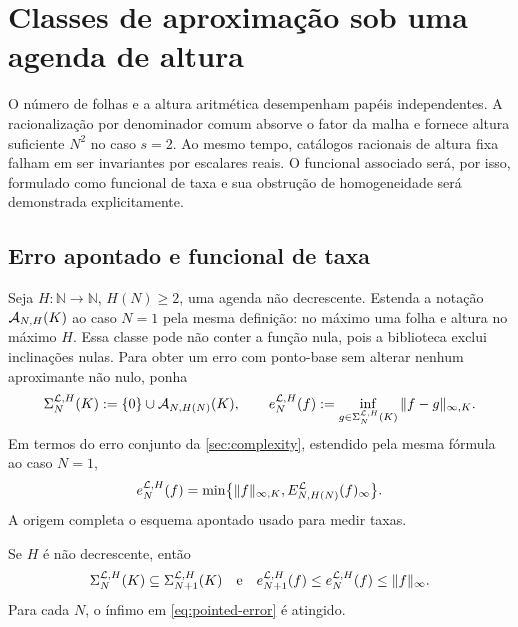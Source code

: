 \section{Classes de aproximação sob uma agenda de altura}
\label{sec:approximation-classes}

O número de folhas e a altura aritmética desempenham papéis independentes. A
racionalização por denominador comum absorve o fator da malha e fornece
altura suficiente $N^2$ no caso $s=2$. Ao mesmo tempo, catálogos racionais de
altura fixa falham em ser invariantes por escalares reais. O funcional
associado será, por isso, formulado como funcional de taxa e sua obstrução de
homogeneidade será demonstrada explicitamente.

\subsection{Erro apontado e funcional de taxa}

Seja $H:\mathbb N\to\mathbb N$, $H(N)\ge2$, uma agenda não decrescente.
Estenda a notação $\mathcal{A}_{N,H}(K)$ ao caso $N=1$ pela mesma
definição: no máximo uma folha e altura no máximo $H$. Essa classe pode não
conter a função nula, pois a
biblioteca exclui inclinações nulas. Para obter um erro com ponto-base sem
alterar nenhum aproximante não nulo, ponha
\begin{equation}
 \Sigma_N^{\mathcal{L},H}(K)
 :=\{0\}\cup\mathcal{A}_{N,H(N)}(K),
 \qquad
 e_N^{\mathcal{L},H}(f)
 :=\inf_{g\in\Sigma_N^{\mathcal{L},H}(K)}\|f-g\|_{\infty,K}.
 \label{eq:pointed-error}
\end{equation}
Em termos do erro conjunto da \cref{sec:complexity}, estendido pela mesma fórmula
ao caso $N=1$,
\begin{equation}
 e_N^{\mathcal{L},H}(f)
 =\min\bigl\{\|f\|_{\infty,K},
 E_{N,H(N)}^{\mathcal{L}}(f)_\infty\bigr\}.
 \label{eq:pointed-inherited}
\end{equation}
A origem completa o esquema apontado usado para medir taxas.

\begin{proposition}
\label{prop:schedule-nesting}
Se $H$ é não decrescente, então
\begin{equation}
 \Sigma_N^{\mathcal{L},H}(K)
 \subseteq\Sigma_{N+1}^{\mathcal{L},H}(K)
 \quad\text{e}\quad
 e_{N+1}^{\mathcal{L},H}(f)\le e_N^{\mathcal{L},H}(f)\le\|f\|_\infty.
 \label{eq:schedule-nesting}
\end{equation}
Para cada $N$, o ínfimo em \eqref{eq:pointed-error} é atingido.
\end{proposition}

